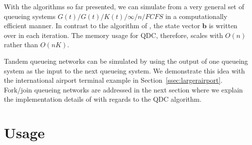 \documentclass[article]{jss}
\begin{document}
With the algorithms so far presented, we can simulate from a very general set of queueing systems $G(t)/G(t)/K(t)/\infty/n/\mathit{FCFS}$ in a computationally efficient manner. In contrast to the algorithm of \cite{kin_generalized_2010}, the state vector $\mathbf{b}$ is written over in each iteration. The memory usage for QDC, therefore, scales with $O(n)$ rather than $O(nK)$. 

Tandem queueing networks can be simulated by using the output of one
queueing system as the input to the next queueing system. We
demonstrate this idea with the international airport terminal example
in Section~\ref{ssec:largerairport}. Fork/join queueing networks are
addressed in the next section where we explain the implementation
details of  with regards to the QDC algorithm.

\section{Usage} \label{sec:usage}
\end{document}
